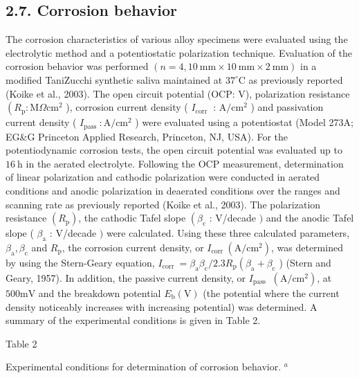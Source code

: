 \documentclass[10pt]{article}
\begin{document}
\subsection*{2.7. Corrosion behavior}
The corrosion characteristics of various alloy specimens were evaluated using the electrolytic method and a potentiostatic polarization technique. Evaluation of the corrosion behavior was performed $(n=4,10 \mathrm{~mm} \times 10 \mathrm{~mm} \times 2 \mathrm{~mm})$ in a modified TaniZucchi synthetic saliva maintained at $37^{\circ} \mathrm{C}$ as previously reported (Koike et al., 2003). The open circuit potential (OCP: V), polarization resistance $\left(R_{\mathrm{p}}: \mathrm{M} \Omega \mathrm{cm}^{2}\right.$ ), corrosion current density ( $I_{\text {corr }}$ : $\mathrm{A} / \mathrm{cm}^{2}$ ) and passivation current density ( $I_{\text {pass }}: \mathrm{A} / \mathrm{cm}^{2}$ ) were evaluated using a potentiostat (Model 273A; EG\&G Princeton Applied Research, Princeton, NJ, USA). For the potentiodynamic corrosion tests, the open circuit potential was evaluated up to $16 \mathrm{~h}$ in the aerated electrolyte. Following the OCP measurement, determination of linear polarization and cathodic polarization were conducted in aerated conditions and anodic polarization in deaerated conditions over the ranges and scanning rate as previously reported (Koike et al., 2003). The polarization resistance $\left(R_{\mathrm{p}}\right)$, the cathodic Tafel slope $\left(\beta_{\mathrm{c}}\right.$ : V/decade $)$ and the anodic Tafel slope ( $\beta_{\mathrm{a}}$ : V/decade $)$ were calculated. Using these three calculated parameters, $\beta_{\mathrm{a}}, \beta_{\mathrm{c}}$ and $R_{\mathrm{p}}$, the corrosion current density, or $I_{\text {corr }}\left(\mathrm{A} / \mathrm{cm}^{2}\right)$, was determined by using the Stern-Geary equation, $I_{\text {corr }}=\beta_{\mathrm{a}} \beta_{\mathrm{c}} / 2.3 R_{\mathrm{p}}\left(\beta_{\mathrm{a}}+\beta_{\mathrm{c}}\right.$ ) (Stern and Geary, 1957). In addition, the passive current density, or $I_{\text {pass }}$ $\left(\mathrm{A} / \mathrm{cm}^{2}\right)$, at $500 \mathrm{mV}$ and the breakdown potential $E_{\mathrm{b}}(\mathrm{V})$ (the potential where the current density noticeably increases with increasing potential) was determined. A summary of the experimental conditions is given in Table 2.

Table 2

Experimental conditions for determination of corrosion behavior. ${ }^{a}$
\end{document}
